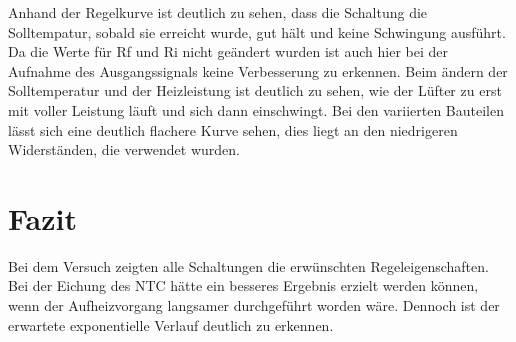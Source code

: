 \documentclass[12pt,a4paper]{article}
\begin{document}
Anhand der Regelkurve ist deutlich zu sehen, dass die Schaltung die Solltempatur, sobald sie erreicht wurde, gut hält und keine Schwingung ausführt. Da die Werte für Rf und Ri nicht geändert wurden ist auch hier bei der Aufnahme des Ausgangssignals keine Verbesserung zu erkennen. Beim ändern der Solltemperatur und der Heizleistung ist deutlich zu sehen, wie der Lüfter zu erst mit voller Leistung läuft und sich dann einschwingt. Bei den variierten Bauteilen lässt sich eine deutlich flachere Kurve sehen, dies liegt an den niedrigeren Widerständen, die verwendet wurden. 

\section{Fazit}

Bei dem Versuch zeigten alle Schaltungen die erwünschten Regeleigenschaften. Bei der Eichung des NTC hätte ein besseres Ergebnis erzielt werden können, wenn der Aufheizvorgang langsamer durchgeführt worden wäre. Dennoch ist der erwartete exponentielle Verlauf deutlich zu erkennen.
\end{document}
